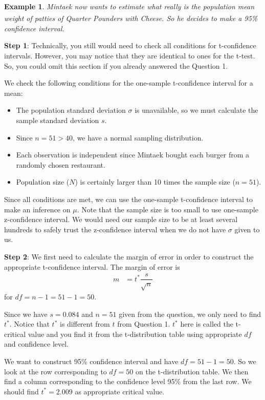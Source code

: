 \documentclass[12pt]{article}
\newcounter{lecnum}
\newtheorem{example}{Example}[lecnum]
\begin{document}
\begin{example}
	Mintaek now wants to estimate what really is the population mean weight of patties of Quarter Pounders\textsuperscript{\textregistered} with Cheese. So he decides to make a 95\% confidence interval.
\end{example}
	
\noindent \textbf{Step 1}: Technically, you still would need to check all conditions for t-confidence intervals. However, you may notice that they are identical to ones for the t-test. So, you could omit this section if you already answered the Question 1.

We check the following conditions for the one-sample t-confidence interval for a mean:
\vspace{-5pt}
\begin{itemize}
	\item The population standard deviation $\sigma$ is unavailable, so we must calculate the sample standard deviation $s$.
	\item Since $n = 51 > 40$, we have a normal sampling distribution.
	\item Each observation is independent since Mintaek bought each burger from a randomly chosen restaurant.
	\item Population size ($N$) is certainly larger than 10 times the sample size ($n=51$).
\end{itemize}
Since all conditions are met, we can use the one-sample t-confidence interval to make an inference on $\mu$. Note that the sample size is too small to use one-sample z-confidence interval. We would need our sample size to be at least several hundreds to safely trust the z-confidence interval when we do not have $\sigma$ given to us.

\noindent \textbf{Step 2}: We first need to calculate the margin of error in order to construct the appropriate t-confidence interval. The margin of error is
\begin{align*}
m &= t^* \dfrac{s}{\sqrt{n}}
\end{align*}
for $df = n-1 = 51 - 1 = 50$.

Since we have $s = 0.084$ and $n = 51$ given from the question, we only need to find $t^*$. Notice that $t^*$ is different from $t$ from Question 1. $t^*$ here is called the t-critical value and you find it from the t-distribution table using appropriate $df$ and confidence level.

We want to construct 95\% confidence interval and have $df = 51 - 1 = 50$. So we look at the row corresponding to $df = 50$ on the t-distribution table. We then find a column corresponding to the confidence level 95\% from the last row. We should find $t^* = 2.009$ as appropriate critical value.
\end{document}
